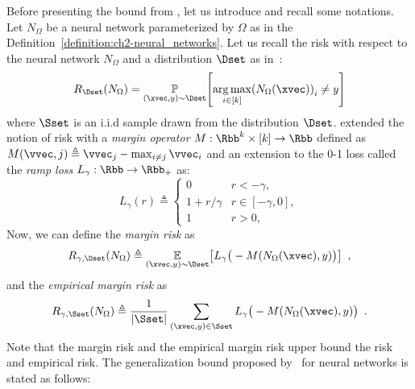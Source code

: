 Before presenting the bound from \citet{bartlett2017spectrally}, let us introduce and recall some notations.
Let $N_\Omega$ be a neural network parameterized by $\Omega$ as in the Definition~\ref{definition:ch2-neural_networks}.
Let us recall the risk with respect to the neural network $N_\Omega$ and a distribution $\Dset$ as in~:
\begin{equation}
  R_\Dset(N_\Omega) = \Pbb_{(\xvec, y) \sim \Dset} \left[ \argmax_{i \in [k]} \left( N_\Omega(\xvec) \right)_i \neq y \right]
\end{equation}
where $\Sset$ is an i.i.d sample drawn from the distribution $\Dset$.
\citet{bartlett2017spectrally} extended the notion of risk with a \emph{margin operator} $\margin: \Rbb^k \times [k] \rightarrow \Rbb$ defined as $\margin(\vvec, j) \triangleq \vvec_j - \max_{i \neq j} \vvec_i$ and an extension to the 0-1 loss called the \emph{ramp loss} $L_\gamma: \Rbb \rightarrow \Rbb_+$ as:
\begin{equation}
  L_\gamma(r) \triangleq 
  \begin{cases}
    0 &r< -\gamma, \\
    1 + r/\gamma &r \in [-\gamma,0], \\
    1 & r > 0,
  \end{cases}
\end{equation}
Now, we can define the \emph{margin risk} as 
\begin{equation} \label{equation:ch2-margin_risk}
  R_{\gamma,\Dset} (N_\Omega) \triangleq \Ebb_{(\xvec, y) \sim \Dset} \left[ L_\gamma \big(-\margin(N_\Omega(\xvec), y) \big) \right] \enspace,
\end{equation}
and the \emph{empirical margin risk} as 
\begin{equation} \label{equation:ch2-emprical_margin_risk}
  R_{\gamma,\Sset} (N_\Omega) \triangleq \frac{1}{|\Sset|} \sum_{(\xvec, y) \in \Sset} L_\gamma \big(-\margin(N_\Omega(\xvec), y) \big) \enspace.
\end{equation}
Note that the margin risk and the empirical margin risk upper bound the risk and empirical risk.
The generalization bound proposed by~\citet{bartlett2017spectrally} for neural networks is stated as follows:
